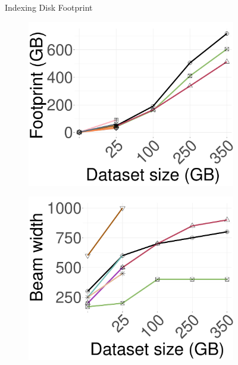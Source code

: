 \begin{figure}[!htb]
\begin{minipage}{0.29\textwidth}
\begin{subfigure}{\textwidth}
		\end{subfigure}	
		\caption{{Indexing Disk Footprint}}
		\label{fig:elpis:idx:footprint:disk}
	\end{minipage}		
	\begin{minipage}{0.28\textwidth}				
		\begin{subfigure}{\textwidth}
			\centering
			\captionsetup{justification=centering}	
			\includegraphics[width=\textwidth]{../img/Experiments/Idx_footprint_datasets/search_footprint_deep_n.pdf}
		\end{subfigure}	
		\caption{{Query Memory Footprint}}
		\label{fig:elpis:query:footprint:memory}
	\end{minipage}	
 \hspace{0.15in}
	\begin{minipage}{0.28\textwidth}
		\centering
		\begin{subfigure}{\textwidth}
			\includegraphics[width=\textwidth]{../img/Experiments/Idx_footprint_datasets/qrs_beamwidth_n.pdf}

\end{subfigure}
\end{minipage}
\end{figure}
